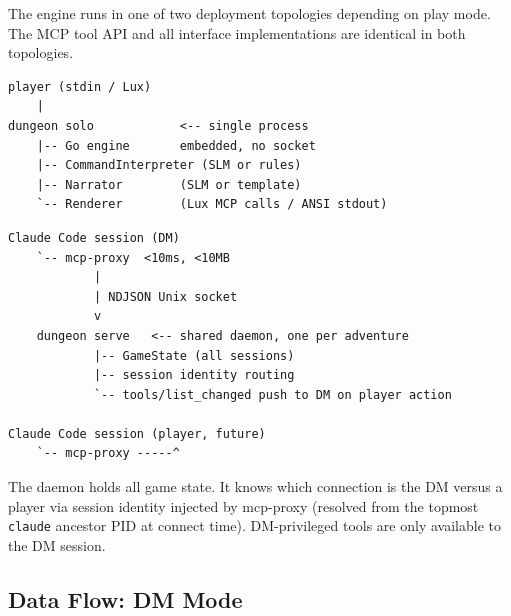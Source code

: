 \documentclass[a4paper,10pt]{article}
\newcommand{\cmd}[1]{\texttt{#1}}
\begin{document}
The engine runs in one of two deployment topologies depending on
play mode.  The MCP tool API and all interface implementations are
identical in both topologies.

\begin{lstlisting}[title={Embedded (solo / headless)}]
player (stdin / Lux)
    |
dungeon solo            <-- single process
    |-- Go engine       embedded, no socket
    |-- CommandInterpreter (SLM or rules)
    |-- Narrator        (SLM or template)
    `-- Renderer        (Lux MCP calls / ANSI stdout)
\end{lstlisting}

\begin{lstlisting}[title={Daemon (dm mode / multi-player)}]
Claude Code session (DM)
    `-- mcp-proxy  <10ms, <10MB
            |
            | NDJSON Unix socket
            v
    dungeon serve   <-- shared daemon, one per adventure
            |-- GameState (all sessions)
            |-- session identity routing
            `-- tools/list_changed push to DM on player action

Claude Code session (player, future)
    `-- mcp-proxy -----^
\end{lstlisting}

The daemon holds all game state.  It knows which connection is the
DM versus a player via session identity injected by mcp-proxy
(resolved from the topmost \cmd{claude} ancestor PID at connect
time).  DM-privileged tools are only available to the DM session.

\subsection{Data Flow: DM Mode}
\end{document}
